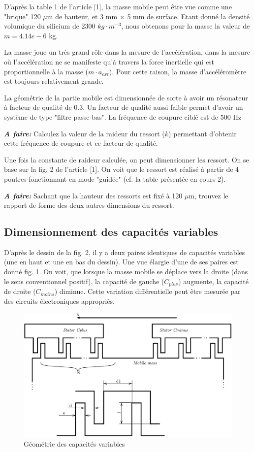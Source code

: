 \documentclass[12pt,A4,onecolumn,french]{article}
\begin{document}
D'après la table 1 de l'article [1], la masse mobile peut être vue comme une
"brique" 120 $\mu$m de hauteur, et 3 mm $\times$ 5 mm de surface. Etant donné la
densité volumique du silicium de 2300 $kg\cdot m^{-3}$, nous obtenons pour la masse la valeur de $m=4.14e-6$ kg.

La masse joue un très grand rôle dans la mesure de l'accélération, dans la mesure où l'accélération ne se manifeste qu'à travers la force inertielle qui est proportionnelle à la masse ($m\cdot a_{ext}$). Pour cette raison, la masse d'accéléromètre est toujours relativement grande.   

La géométrie de la partie mobile est dimensionnée de sorte à avoir un résonateur à facteur de qualité de 0.3. Un facteur de qualité aussi faible permet d'avoir un système de type "filtre passe-bas". La fréquence de coupure ciblé est de 500 Hz 

\emph{\bf A faire: } Calculez la valeur de la raideur du ressort ($k$) permettant d'obtenir cette fréquence de coupure et ce facteur de qualité.    


Une fois la constante de raideur calculée, on peut dimensionner les ressort. On se base sur la fig. 2 de l'article [1]. On voit que le ressort est réalisé à partir de 4 poutres fonctionnant en mode "guidée" (cf. la table présentée en cours 2). 

\emph{\bf A faire: }Sachant que la hauteur des ressorts est fixé à 120 $\mu$m, trouvez le rapport de forme des deux autres dimensions du ressort.

\subsection{Dimensionnement des capacités variables}

D'après le dessin de la fig. 2, il y a deux paires identiques de capacités variables (une en haut et une en bas du dessin). Une vue élargie d'une de ses paires est donné fig. \ref{fig:geometrie}. On voit, que lorsque la masse mobile se déplace vers la droite (dans le sens conventionnel positif), la capacité de gauche ($C_{plus}$) augmente, la capacité de droite ($C_{moins}$) diminue. Cette variation différentielle peut être mesurée par des circuits électroniques appropriés.

\begin{figure}
 \centering
 \includegraphics{capa_geometry.eps}
 \caption{Géométrie des capacités variables \label{fig:geometrie}}
\end{figure}
\end{document}
